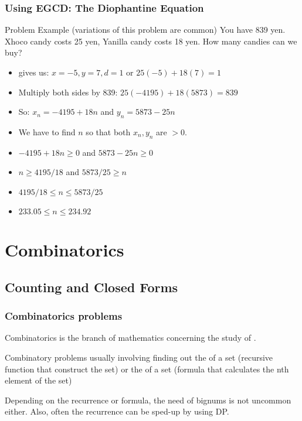 \documentclass{beamer}
\begin{document}
\begin{frame}
  \frametitle{Using EGCD: The Diophantine Equation}
  {\smaller
    \begin{block}{Problem Example (variations of this problem are common)}
      You have 839 yen. \alert{X}hoco candy costs 25 yen,
      \alert{Y}anilla candy costs 18 yen. How many candies can we buy?
    \end{block}
   
    \begin{itemize}
    \item {} gives us: $x=-5, y=7, d=1$ or $25(-5)+18(7) = 1$
    \item Multiply both sides by 839: $25(-4195)+18(5873) = 839$
    \item So: $x_n = -4195 + 18n$ and $y_n = 5873 - 25n$
    \item We have to find $n$ so that both $x_n,y_n$ are $> 0$.
    \item $-4195 + 18n \geq 0$ and $5873 - 25n \geq 0$
    \item $n \geq 4195/18$ and $5873/25 \geq n$
    \item $4195/18 \leq n \leq 5873/25$
    \item $233.05 \leq n \leq 234.92$
    \end{itemize} 
  }
\end{frame}


\section{Combinatorics}
\subsection{Counting and Closed Forms}
\begin{frame}
  \frametitle{Combinatorics problems} 

  {\smaller
  Combinatorics is the branch of mathematics concerning the study of
  .

  \bigskip

  Combinatory problems usually involving finding out the
   of a set (recursive function that construct
  the set) or the  of a set (formula that
  calculates the nth element of the set)

  \bigskip

  Depending on the recurrence or formula, the need of bignums is not
  uncommon either. Also, often the recurrence can be sped-up by using
  DP.
  }
\end{frame}
\end{document}
